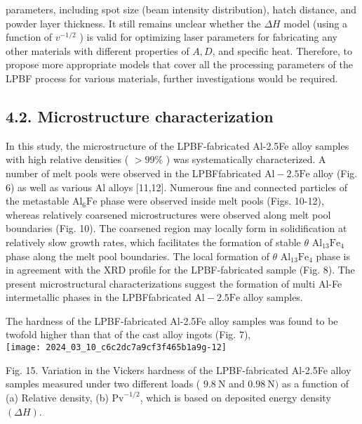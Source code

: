 \documentclass[10pt]{article}
\begin{document}
parameters, including spot size (beam intensity distribution), hatch distance, and powder layer thickness. It still remains unclear whether the $\Delta H$ model (using a function of $v^{-1 / 2}$ ) is valid for optimizing laser parameters for fabricating any other materials with different properties of $A, D$, and specific heat. Therefore, to propose more appropriate models that cover all the processing parameters of the LPBF process for various materials, further investigations would be required.

\subsection*{4.2. Microstructure characterization}
In this study, the microstructure of the LPBF-fabricated Al-2.5Fe alloy samples with high relative densities ( $>99 \%$ ) was systematically characterized. A number of melt pools were observed in the LPBFfabricated $\mathrm{Al}-2.5 \mathrm{Fe}$ alloy (Fig. 6) as well as various $\mathrm{Al}$ alloys [11,12]. Numerous fine and connected particles of the metastable $\mathrm{Al}_{6} \mathrm{Fe}$ phase were observed inside melt pools (Figs. 10-12), whereas relatively coarsened microstructures were observed along melt pool boundaries (Fig. 10). The coarsened region may locally form in solidification at relatively slow growth rates, which facilitates the formation of stable $\theta$ $\mathrm{Al}_{13} \mathrm{Fe}_{4}$ phase along the melt pool boundaries. The local formation of $\theta$ $\mathrm{Al}_{13} \mathrm{Fe}_{4}$ phase is in agreement with the XRD profile for the LPBF-fabricated sample (Fig. 8). The present microstructural characterizations suggest the formation of multi Al-Fe intermetallic phases in the LPBFfabricated $\mathrm{Al}-2.5 \mathrm{Fe}$ alloy samples.

The hardness of the LPBF-fabricated Al-2.5Fe alloy samples was found to be twofold higher than that of the cast alloy ingots (Fig. 7),\\
\texttt{[image: 2024\_03\_10\_c6c2dc7a9cf3f465b1a9g-12]}

Fig. 15. Variation in the Vickers hardness of the LPBF-fabricated Al-2.5Fe alloy samples measured under two different loads ( $9.8 \mathrm{~N}$ and $0.98 \mathrm{~N})$ as a function of (a) Relative density, (b) $\mathrm{Pv}^{-1 / 2}$, which is based on deposited energy density $(\Delta H)$.
\end{document}
